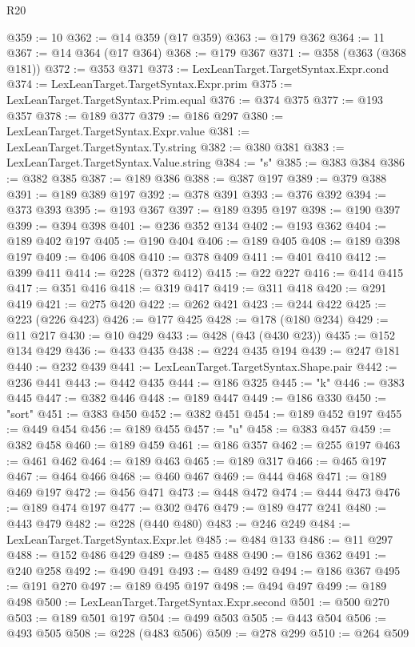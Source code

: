 \begin{lexlean}{R20}
\begin{coremodule}
@359 := 10
@362 := @14 @359 (@17 @359)
@363 := @179 @362
@364 := 11
@367 := @14 @364 (@17 @364)
@368 := @179 @367
@371 := @358 (@363 (@368 @181))
@372 := @353 @371
@373 := LexLeanTarget.TargetSyntax.Expr.cond
@374 := LexLeanTarget.TargetSyntax.Expr.prim
@375 := LexLeanTarget.TargetSyntax.Prim.equal
@376 := @374 @375
@377 := @193 @357
@378 := @189 @377
@379 := @186 @297
@380 := LexLeanTarget.TargetSyntax.Expr.value
@381 := LexLeanTarget.TargetSyntax.Ty.string
@382 := @380 @381
@383 := LexLeanTarget.TargetSyntax.Value.string
@384 := "s"
@385 := @383 @384
@386 := @382 @385
@387 := @189 @386
@388 := @387 @197
@389 := @379 @388
@391 := @189 @389 @197
@392 := @378 @391
@393 := @376 @392
@394 := @373 @393
@395 := @193 @367
@397 := @189 @395 @197
@398 := @190 @397
@399 := @394 @398
@401 := @236 @352 @134
@402 := @193 @362
@404 := @189 @402 @197
@405 := @190 @404
@406 := @189 @405
@408 := @189 @398 @197
@409 := @406 @408
@410 := @378 @409
@411 := @401 @410
@412 := @399 @411
@414 := @228 (@372 @412)
@415 := @22 @227
@416 := @414 @415
@417 := @351 @416
@418 := @319 @417
@419 := @311 @418
@420 := @291 @419
@421 := @275 @420
@422 := @262 @421
@423 := @244 @422
@425 := @223 (@226 @423)
@426 := @177 @425
@428 := @178 (@180 @234)
@429 := @11 @217
@430 := @10 @429
@433 := @428 (@43 (@430 @23))
@435 := @152 @134 @429
@436 := @433 @435
@438 := @224 @435 @194
@439 := @247 @181
@440 := @232 @439
@441 := LexLeanTarget.TargetSyntax.Shape.pair
@442 := @236 @441
@443 := @442 @435
@444 := @186 @325
@445 := "k"
@446 := @383 @445
@447 := @382 @446
@448 := @189 @447
@449 := @186 @330
@450 := "sort"
@451 := @383 @450
@452 := @382 @451
@454 := @189 @452 @197
@455 := @449 @454
@456 := @189 @455
@457 := "u"
@458 := @383 @457
@459 := @382 @458
@460 := @189 @459
@461 := @186 @357
@462 := @255 @197
@463 := @461 @462
@464 := @189 @463
@465 := @189 @317
@466 := @465 @197
@467 := @464 @466
@468 := @460 @467
@469 := @444 @468
@471 := @189 @469 @197
@472 := @456 @471
@473 := @448 @472
@474 := @444 @473
@476 := @189 @474 @197
@477 := @302 @476
@479 := @189 @477 @241
@480 := @443 @479
@482 := @228 (@440 @480)
@483 := @246 @249
@484 := LexLeanTarget.TargetSyntax.Expr.let
@485 := @484 @133
@486 := @11 @297
@488 := @152 @486 @429
@489 := @485 @488
@490 := @186 @362
@491 := @240 @258
@492 := @490 @491
@493 := @489 @492
@494 := @186 @367
@495 := @191 @270
@497 := @189 @495 @197
@498 := @494 @497
@499 := @189 @498
@500 := LexLeanTarget.TargetSyntax.Expr.second
@501 := @500 @270
@503 := @189 @501 @197
@504 := @499 @503
@505 := @443 @504
@506 := @493 @505
@508 := @228 (@483 @506)
@509 := @278 @299
@510 := @264 @509

\end{coremodule}
\end{lexlean}
